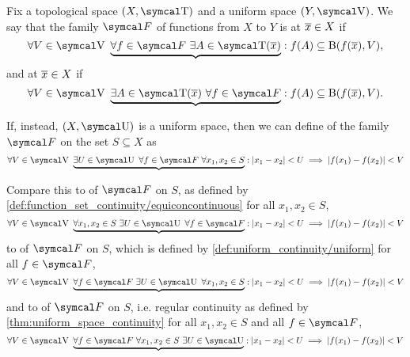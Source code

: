 \begin{definition}\label{def:function_set_continuity}\cite[285]{Bouziad2004}
  Fix a topological space \( (X, \T) \) and a uniform space \( (Y, \V) \). We say that the family \( \Cal{F} \) of functions from \( X \) to \( Y \) is  at \( \overline{x} \in X \) if
  \begin{equation}\label{def:function_set_continuity/functionwise}
    \forall V \in \V \ \underbrace{\forall f \in \Cal{F} \ \exists A \in \T(\Ol{x})} : f(A) \subseteq \B(f(\Ol{x}), V),
  \end{equation}
  and  at \( \overline{x} \in X \) if
  \begin{equation}\label{def:function_set_continuity/equiconcontinuous}
    \forall V \in \V \ \underbrace{\exists A \in \T(\Ol{x}) \ \forall f \in \Cal{F}} : f(A) \subseteq \B(f(\Ol{x}), V).
  \end{equation}

  If, instead, \( (X, \U) \) is a uniform space, then we can define  of the family \( \Cal{F} \) on the set \( S \subseteq X \) as
  \begin{equation}\label{def:function_set_continuity/uniform_equicontinuous}
    \forall V \in \V \ \underbrace{\exists U \in \U \ \forall f \in \Cal{F} \ \forall x_1, x_2 \in S} : \Abs{x_1 - x_2} < U \implies \Abs{f(x_1) - f(x_2)} < V
  \end{equation}

  Compare this to  of \( \Cal{F} \) on \( S \), as defined by \cref{def:function_set_continuity/equiconcontinuous} for all \( x_1, x_2 \in S \),
  \begin{equation}\label{def:function_set_continuity/uniform_functionwise}
    \forall V \in \V \ \underbrace{\forall x_1, x_2 \in S \ \exists U \in \U \ \forall f \in \Cal{F}} : \Abs{x_1 - x_2} < U \implies \Abs{f(x_1) - f(x_2)} < V
  \end{equation}
  to  of \( \Cal{F} \) on \( S \), which is defined by \cref{def:uniform_continuity/uniform} for all \( f \in \Cal{F} \),
  \begin{equation}\label{def:function_set_continuity/uniform_functionwise}
    \forall V \in \V \ \underbrace{\forall f \in \Cal{F} \ \exists U \in \U \ \forall x_1, x_2 \in S} : \Abs{x_1 - x_2} < U \implies \Abs{f(x_1) - f(x_2)} < V
  \end{equation}
  and to  of \( \Cal{F} \) on \( S \), i.e. regular continuity as defined by \cref{thm:uniform_space_continuity} for all \( x_1, x_2 \in S \) and all \( f \in \Cal{F} \),
  \begin{equation}\label{def:function_set_continuity/functionwise_pointwise}
    \forall V \in \V \ \underbrace{\forall f \in \Cal{F} \ \forall x_1, x_2 \in S \ \exists U \in \U} : \Abs{x_1 - x_2} < U \implies \Abs{f(x_1) - f(x_2)} < V
  \end{equation}
\end{definition}
